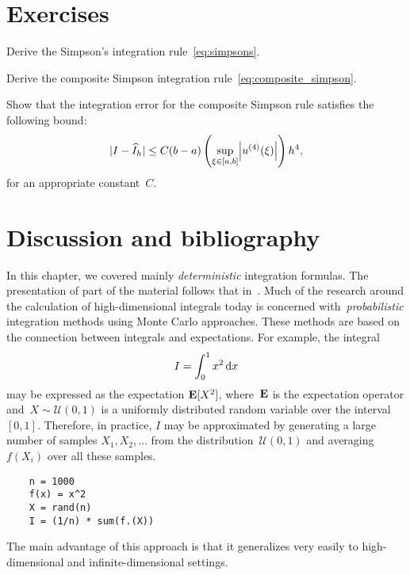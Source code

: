 \section{Exercises}
\begin{exercise}
    Derive the Simpson's integration rule~\eqref{eq:simpsons}.
\end{exercise}

\begin{exercise}
    \label{exercise:composite_simpson}
    Derive the composite Simpson integration rule~\eqref{eq:composite_simpson}.
\end{exercise}

\begin{exercise}
    Show that the integration error for the composite Simpson rule satisfies the following bound:
    \[
        \abs{I - \widehat I_h}
        \leq C (b-a) \left( \sup_{\xi \in [a, b]} \abs*{u^{(4)}(\xi)} \right) h^4,
    \]
    for an appropriate constant~$C$.
\end{exercise}

\section{Discussion and bibliography}
In this chapter,
we covered mainly \emph{deterministic} integration formulas.
The presentation of part of the material follows that in~\cite{Legat}.
Much of the research around the calculation of high-dimensional integrals today is concerned with~\emph{probabilistic} integration methods using Monte Carlo approaches.
These methods are based on the connection between integrals and expectations.
For example, the integral
\[
    I = \int_{0}^{1} x^2 \, \mathrm d x
\]
may be expressed as the expectation $\mathbf E [X^2]$,
where~$\mathbf E$ is the expectation operator and~$X \sim \mathcal U(0, 1)$ is a uniformly distributed random variable over the interval~$[0, 1]$.
Therefore, in practice, $I$ may be approximated by generating a large number of samples $X_1, X_2,\dotsc$ from the distribution~$\mathcal U(0, 1)$
and averaging $f(X_i)$ over all these samples.
\begin{verbatim}
    n = 1000
    f(x) = x^2
    X = rand(n)
    I = (1/n) * sum(f.(X))
\end{verbatim}
The main advantage of this approach is that it generalizes very easily to high-dimensional and infinite-dimensional settings.
